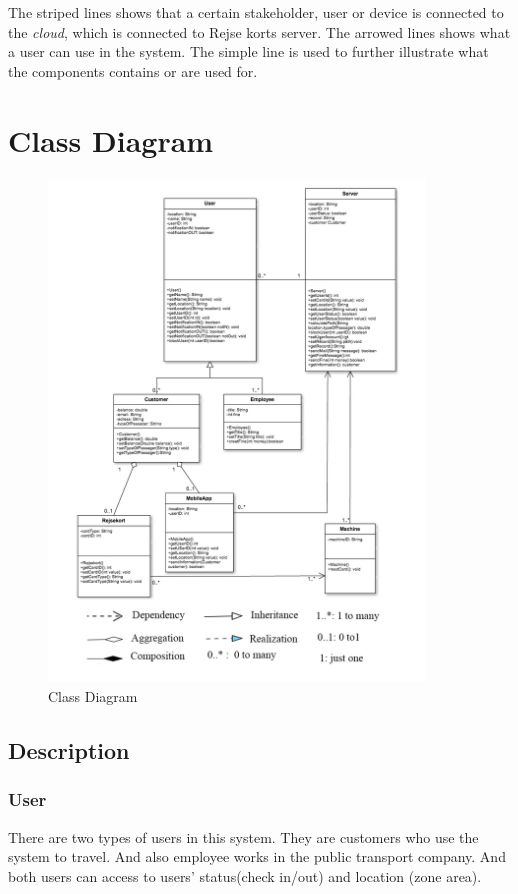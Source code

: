 The striped lines shows that a certain stakeholder, user or device is connected to the \textit{cloud}, which is connected to Rejse korts server.
The arrowed lines shows what a user can use in the system.
The simple line is used to further illustrate what the components contains or are used for.


\section*{Class Diagram}

\begin{figure}[ht!]
\centering
\includegraphics[width=100mm]{graphics/classdiagram.jpg}
\caption{Class Diagram}
\label{overflow}
\end{figure}

\subsection*{Description}

\subsubsection{User}
There are two types of users in this system. They are customers who use the system to travel. And also employee works in the public transport company. And both users can access to users’ status(check in/out) and location (zone area).

